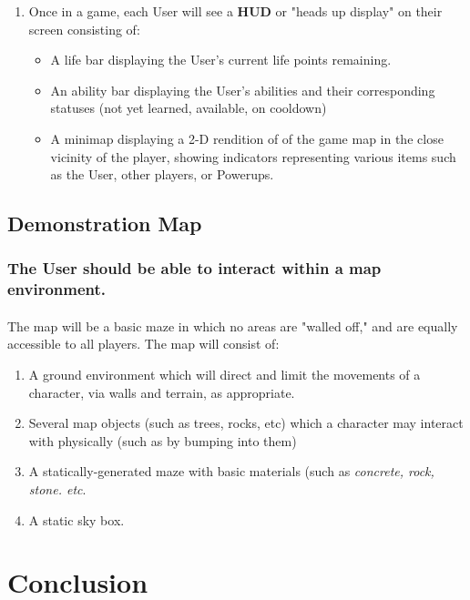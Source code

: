 \documentclass{article}
\begin{document}
\begin{enumerate}
 \item Once in a game, each User will see a \textbf{HUD} or "heads up display" on their screen consisting of:
 
  \begin{itemize}
      \item A life bar displaying the User's current life points remaining.
      \item An ability bar displaying the User's abilities and their corresponding statuses (not yet learned, available, on cooldown)
      \item A minimap displaying a 2-D rendition of of the game map in the close vicinity of the player, showing indicators representing various items such as the User, other players, or Powerups.
  \end{itemize}
\end{enumerate}

\subsection{Demonstration Map}
\subsubsection{\textbf{The User should be able to interact within a map environment.}}
\paragraph{}The map will be a basic maze in which no areas are "walled off," and are equally accessible to all players. The map will consist of:

\begin{enumerate}
  \item A ground environment which will direct and limit the movements of a character, via walls and terrain, as appropriate.
  \item Several map objects (such as trees, rocks, etc) which a character may interact with physically (such as by bumping into them)
  \item A statically-generated maze with basic materials (such as \textit{concrete, rock, stone. etc}.
  \item A static sky box.
\end{enumerate}

\section{Conclusion}
\end{document}
